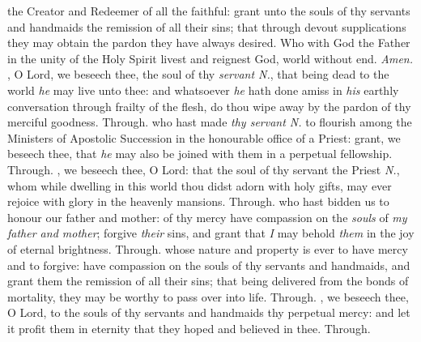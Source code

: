 
\label{dead}
 the Creator and Redeemer of all the faithful: grant unto the souls of thy servants and handmaids the remission of all their sins; that through devout supplications they may obtain the pardon they have always desired. Who with God the Father in the unity of the Holy Spirit livest and reignest God, world without end. \textit{Amen.}
, O Lord, we beseech thee, the soul of thy \textit{servant N.}, that being dead to the world \textit{he} may live unto thee: and whatsoever \textit{he} hath done amiss in \textit{his} earthly conversation through frailty of the flesh, do thou wipe away by the pardon of thy merciful goodness. Through.
 who hast made \textit{thy servant N.} to flourish among the Ministers of Apostolic Succession in the honourable office of a Priest: grant, we beseech thee, that \textit{he} may also be joined with them in a perpetual fellowship. Through.
, we beseech thee, O Lord: that the soul of thy servant the Priest \textit{N.}, whom while dwelling in this world thou didst adorn with holy gifts, may ever rejoice with glory in the heavenly mansions. Through.
 who hast bidden us to honour our father and mother: of thy mercy have compassion on the \textit{souls} of \textit{my father and mother}; forgive \textit{their} sins, and grant that \textit{I} may behold \textit{them} in the joy of eternal brightness. Through.
 whose nature and property is ever to have mercy and to forgive: have compassion on the souls of thy servants and handmaids, and grant them the remission of all their sins; that being delivered from the bonds of mortality, they may be worthy to pass over into life. Through.
, we beseech thee, O Lord, to the souls of thy servants and handmaids thy perpetual mercy: and let it profit them in eternity that they hoped and believed in thee. Through.
